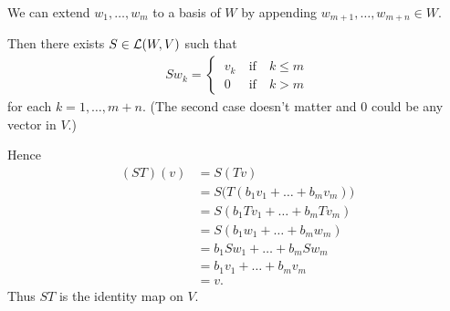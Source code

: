 \documentclass[a5paper]{article}
\begin{document}
    We can extend $w_1,\dots,w_m$ to a basis of $W$ by appending $w_{m+1},\dots,w_{m+n} \in W$.

    Then there exists $S \in \mathcal{L}(W,V)$ such that
\begin{align*}
        Sw_k =
            \begin{cases}
                \ v_k \ &\text{if}\quad k \le m \\
                \ 0   \ &\text{if}\quad k  >  m
            \end{cases}
\end{align*}
    for each $k = 1,\dots,m+n$.
    (The second case doesn't matter and 0 could be any vector in $V$.)

    Hence
\begin{align*}
        (ST)(v) &= S(Tv) \\
                &= S \big( T(b_1v_1 + \dots + b_mv_m) \big) \\
                &= S (b_1Tv_1 + \dots + b_mTv_m ) \\
                &= S(b_1w_1 + \dots + b_mw_m) \\
                &= b_1Sw_1 + \dots + b_mSw_m \\
                &= b_1v_1 + \dots + b_mv_m \\
                &= v .
\end{align*}
    Thus $ST$ is the identity map on $V$.
\end{document}
